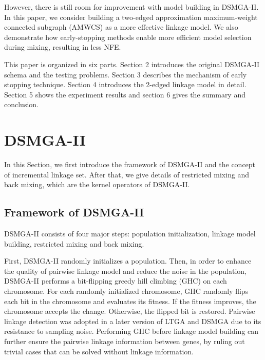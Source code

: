 \documentclass{sig-alternate-05-2015}
\begin{document}
However, there is still room for improvement with model building in DSMGA-II. In this paper, we consider building a two-edged approximation maximum-weight connected subgraph (AMWCS) as a more effective linkage model. We also demonstrate how early-stopping methods enable more efficient model selection during mixing, resulting in less NFE.


This paper is organized in six parts. Section 2 introduces the original DSMGA-II schema and the testing problems. Section 3 describes the mechanism of early stopping technique. Section 4 introduces the 2-edged linkage model in detail. Section 5 shows the experiment results and section 6 gives the summary and conclusion.



\section{DSMGA-II}
In this Section, we first introduce the framework of DSMGA-II and the concept of incremental linkage set. After that, we give details of restricted mixing and back mixing, which are the kernel operators of DSMGA-II.


\subsection{Framework of DSMGA-II}
DSMGA-II consists of four major steps: population initialization, linkage model building, restricted mixing and back mixing. 

First, DSMGA-II randomly initializes a population. Then, in order to enhance the quality of pairwise linkage model and reduce the noise in the population, DSMGA-II performs a bit-flipping greedy hill climbing (GHC) on each chromosome. For each randomly initialized chromosome, GHC randomly flips each bit in the chromosome and evaluates its fitness. If the fitness improves, the chromosome accepts the change. Otherwise, the flipped bit is restored. Pairwise linkage detection was adopted in a later version of LTGA \cite{pelikan:pairwise} and DSMGA \cite{yu:DSMGA} due to its resistance to sampling noise. Performing GHC before linkage model building can further ensure the pairwise linkage information between genes, by ruling out trivial cases that can be solved without linkage information. 
\end{document}

